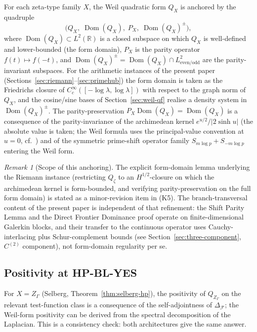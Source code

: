 \documentclass[11pt]{article}
\theoremstyle{definition}
\theoremstyle{remark}
\newtheorem{remark}[theorem]{Remark}
\begin{document}
For each zeta-type family $X$, the Weil quadratic form $Q_X$ is
anchored by the quadruple
\begin{equation}\label{eq:weil-quadruple}
  \bigl(Q_X,\; \operatorname{Dom}(Q_X),\; P_X,\;
        \operatorname{Dom}(Q_X)^{\pm}\bigr),
\end{equation}
where $\operatorname{Dom}(Q_X) \subset L^2(\mathbb{R})$ is a
closed subspace on which $Q_X$ is well-defined and lower-bounded
(the form domain), $P_X$ is the parity operator
$f(t) \mapsto f(-t)$, and
$\operatorname{Dom}(Q_X)^{\pm}
  = \operatorname{Dom}(Q_X) \cap L^2_{\mathrm{even/odd}}$
are the parity-invariant subspaces. For the arithmetic instances
of the present paper (Sections~\ref{sec:riemann}--\ref{sec:primehub})
the form domain is taken as the Friedrichs closure of
$C_c^{\infty}([-\log\lambda,\log\lambda])$ with respect to the
graph norm of $Q_X$, and the cosine/sine bases of
Section~\ref{sec:weil-qf} realise a density system in
$\operatorname{Dom}(Q_X)^{\pm}$. The parity-preservation
$P_X \operatorname{Dom}(Q_X) = \operatorname{Dom}(Q_X)$ is a
consequence of the parity-invariance of the archimedean kernel
$e^{u/2}/|2\sinh u|$ (the absolute value is taken; the Weil
formula uses the principal-value convention at $u = 0$, cf.\
\cite{Weil1952}) and of the symmetric prime-shift operator family
$S_{m\log p} + S_{-m\log p}$ entering the Weil form.

\begin{remark}[Scope of this anchoring]\label{rem:form-domain-scope}
The explicit form-domain lemma underlying the Riemann instance
(restricting $Q_\zeta$ to an $H^{1/2}$-closure on which the
archimedean kernel is form-bounded, and verifying
parity-preservation on the full form domain) is stated as a
minor-revision item in \cite{RHCritiqueReview2026} (K5). The
branch-transversal content of the present paper is independent
of that refinement: the Shift Parity Lemma and the Direct
Frontier Dominance proof operate on finite-dimensional Galerkin
blocks, and their transfer to the continuous operator uses
Cauchy-interlacing plus Schur-complement bounds (see
Section~\ref{sec:three-component}, $C^{(2)}$ component), not
form-domain regularity per se.
\end{remark}

\subsection{Positivity at HP-BL-YES}

For $X = Z_\Gamma$ (Selberg, Theorem~\ref{thm:selberg-hp}), the
positivity of $Q_{Z_\Gamma}$ on the relevant test-function class is
a consequence of the self-adjointness of $\Delta_\mathcal{F}$; the
Weil-form positivity can be derived from the spectral decomposition
of the Laplacian. This is a consistency check: both architectures
give the same answer.
\end{document}
